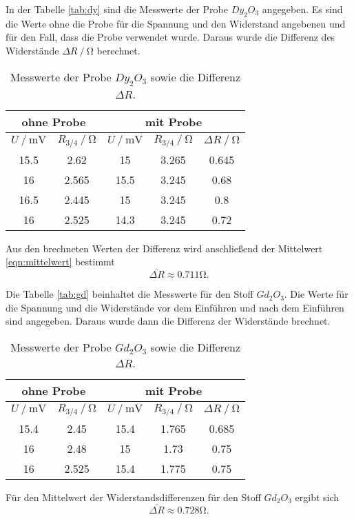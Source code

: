 In der Tabelle \eqref{tab:dy} sind die Messwerte der Probe $Dy_2O_3$ angegeben. Es sind die 
Werte ohne die Probe für die Spannung und den Widerstand angebenen und für den Fall, dass die Probe
verwendet wurde. Daraus wurde die Differenz des Widerstände $\Delta R\mathbin{/}\si{\ohm}$ berechnet.

\begin{table}
  \centering
  \caption{Messwerte der Probe $Dy_2O_3$ sowie die Differenz $\Delta R$.}
  \label{tab:dy}
\begin{tabular}{c c | c c | c}
  \hline
  \multicolumn{2}{c}{ohne Probe} & \multicolumn{3}{c}{mit Probe} \\
  \hline
  $U\mathbin{/} \si{\mV}$ & $R_{3/4}\mathbin{/} \si{\ohm}$ & $U\mathbin{/} \si{\mV}$ & $R_{3/4}\mathbin{/} \si{\ohm}$ & $\Delta R\mathbin{/}\si{\ohm}$ \\
  \hline
  15.5  & 2.62 & 15    & 3.265 & 0.645\\
  16  & 2.565 & 15.5   & 3.245 & 0.68\\
  16.5 & 2.445 & 15   & 3.245 & 0.8\\
  16  & 2.525 & 14.3   & 3.245 & 0.72\\
  \bottomrule
  \end{tabular}
\end{table}

Aus den brechneten Werten der Differenz wird anschließend der Mittelwert \eqref{eqn:mittelwert} bestimmt
\begin{equation*}
  \bar{\Delta R} \approx 0.711 \si{\ohm}.
\end{equation*}

Die Tabelle \eqref{tab:gd} beinhaltet die Messwerte für den Stoff $Gd_2O_3$. Die Werte für die Spannung und die Widerstände
vor dem Einführen und nach dem Einführen sind angegeben. Daraus wurde dann die Differenz der Widerstände brechnet. 
\begin{table}
  \centering
  \caption{Messwerte der Probe $Gd_2O_3$ sowie die Differenz $\Delta R$.}
  \label{tab:gd}
\begin{tabular}{c c | c c | c}
  \hline
  \multicolumn{2}{c}{ohne Probe} & \multicolumn{3}{c}{mit Probe} \\
  \hline
  $U\mathbin{/} \si{\mV}$ & $R_{3/4}\mathbin{/} \si{\ohm}$ & $U\mathbin{/} \si{\mV}$ & $R_{3/4}\mathbin{/} \si{\ohm}$ & $\Delta R\mathbin{/}\si{\ohm}$ \\
  \hline
  15.4 & 2.45 & 15.4  & 1.765 & 0.685\\
  16  & 2.48 & 15  & 1.73 & 0.75\\
  16 & 2.525& 15.4  & 1.775 & 0.75\\
  \bottomrule
  \end{tabular}
\end{table}

Für den Mittelwert der Widerstandsdifferenzen für den Stoff $Gd_2O_3$ ergibt sich
\begin{equation*}
  \bar{\Delta R} \approx 0.728 \si{\ohm}.
\end{equation*}

